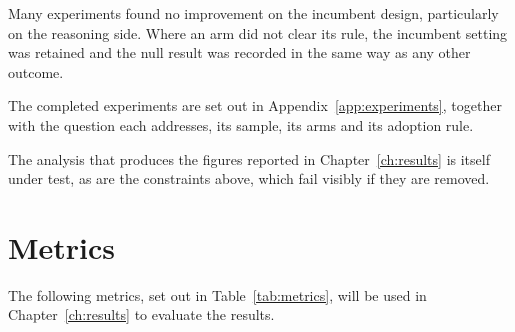 Many experiments found no improvement on the incumbent design, particularly on the reasoning side. Where an arm did not clear its rule, the incumbent setting was retained and the null result was recorded in the same way as any other outcome.

The completed experiments are set out in Appendix~\ref{app:experiments}, together with the question each addresses, its sample, its arms and its adoption rule.

The analysis that produces the figures reported in Chapter~\ref{ch:results} is itself under test, as are the constraints above, which fail visibly if they are removed.

\section{Metrics}\label{sec:metrics}

The following metrics, set out in Table~\ref{tab:metrics}, will be used in Chapter~\ref{ch:results} to evaluate the results.


